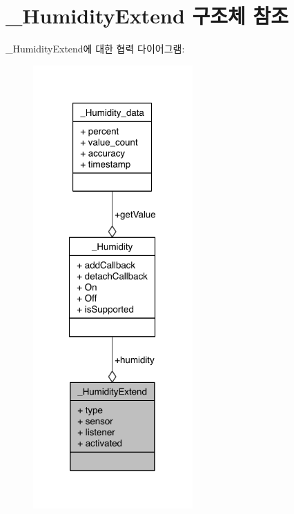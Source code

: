 \hypertarget{struct__HumidityExtend}{\section{\-\_\-\-Humidity\-Extend 구조체 참조}
\label{struct__HumidityExtend}
}


\-\_\-\-Humidity\-Extend에 대한 협력 다이어그램\-:\nopagebreak
\begin{figure}[H]
\begin{center}
\leavevmode
\includegraphics[width=173pt]{d7/ded/struct__HumidityExtend__coll__graph}
\end{center}
\end{figure}
